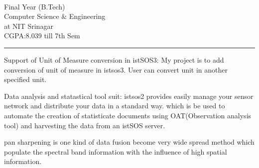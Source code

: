 \documentclass[localFont,alternative,10pt,compact]{main}
\begin{document}
    \begin{minipage}[t]{0.66\textwidth}
        \begin{large}
            \\
        \end{large}
        Final Year (B.Tech)\\
        Computer Science $\&$  Engineering\\
        at NIT Srinagar \\
        CGPA:8.039 till 7th Sem




        \noindent\rule{12.5cm}{0.4pt}
         
        \noindent
        \hspace{5em}%
        \begin{minipage}{0.85\textwidth\vspace{2pt}}
            Support of Unit of Measure conversion in istSOS3: My project is to add conversion of
            unit of measure in istsos3. User can convert unit in another specified unit.
        \end{minipage}
        \sectionsep

         
        \noindent
        \hspace{5em}%
        \begin{minipage}{0.85\textwidth\vspace{2pt}}
            Data analysis and statastical tool suit: istsos2 provides easily manage your sensor network
            and distribute your data in a standard way. which is be used to automate the creation of statisticate
            documents using OAT(Observation analysis tool) and harvesting the data from an istSOS server.
        \end{minipage}
        \sectionsep

         
        \noindent
        \hspace{5em}%
        \begin{minipage}{0.85\textwidth\vspace{2pt}}
            pan sharpening is one kind of data fusion become very wide spread method which populate the spectral band information with the influence of high spatial information.
        \end{minipage}
        \sectionsep


\end{minipage}
\end{document}
